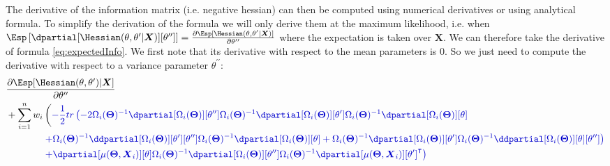 \documentclass[12pt]{article}
\newcommand{\darkblue}{blue!80!black}
\newcommand{\darkred}{red!50!black}
\newcommand\trans[1]{{#1}^\intercal}%
\newcommand{\param}{\Theta}
\newcommand{\Vparam}{\boldsymbol{\param}}
\newcommand{\VX}{\boldsymbol{X}}
\begin{document}
The derivative of the information matrix (i.e. negative hessian) can
then be computed using numerical derivatives or using analytical
formula. To simplify the derivation of the formula we will only derive
them at the maximum likelihood, i.e. when
\(\Esp\left[\dpartial[\Hessian(\theta,\theta^{\prime}|\VX)][\theta^{\prime\prime}]\right]=\frac{\partial
\Esp[\Hessian(\theta,\theta^{\prime}|\VX)]}{\partial
\theta^{\prime\prime}}\) where the expectation is taken over
\(\VX\). We can therefore take the derivative of formula
\eqref{eq:expectedInfo}. We first note that its derivative with respect
to the mean parameters is 0. So we just need to compute the derivative
with respect to a variance parameter \(\theta^{\prime\prime}\):
\begin{align*}
 & \frac{\partial\Esp[\Hessian(\theta,\theta^{\prime})|\VX]}{\partial \theta^{\prime\prime}} \notag\\ 
 & + \sum_{i=1}^n w_i \left( \textcolor{\darkblue}{
- \frac{1}{2} tr\left(
-2\Omega_i(\Vparam)^{-1} \dpartial[\Omega_i(\Vparam)][\theta^{\prime\prime}] \Omega_i(\Vparam)^{-1} \dpartial[\Omega_i(\Vparam)][\theta^{\prime}] \Omega_i(\Vparam)^{-1} \dpartial[\Omega_i(\Vparam)][\theta] \right. } \right. \\
& \qquad \qquad \textcolor{\darkblue}{\left. + \Omega_i(\Vparam)^{-1} \ddpartial[\Omega_i(\Vparam)][\theta^{\prime}][\theta^{\prime\prime}] \Omega_i(\Vparam)^{-1} \dpartial[\Omega_i(\Vparam)][\theta]
+ \Omega_i(\Vparam)^{-1} \dpartial[\Omega_i(\Vparam)][\theta^{\prime}] \Omega_i(\Vparam)^{-1} \ddpartial[\Omega_i(\Vparam)][\theta][\theta^{\prime\prime}]
\right)} \\
& \qquad \qquad  \textcolor{\darkblue}{\left. + \dpartial[\mu(\Vparam,\VX_i)][\theta] \Omega_i(\Vparam)^{-1} \dpartial[\Omega_i(\Vparam)][\theta^{\prime\prime}] \Omega_i(\Vparam)^{-1}   \trans{\dpartial[\mu(\Vparam,\VX_i)][\theta^{\prime}]}
 \right)}
\end{align*}
\end{document}
